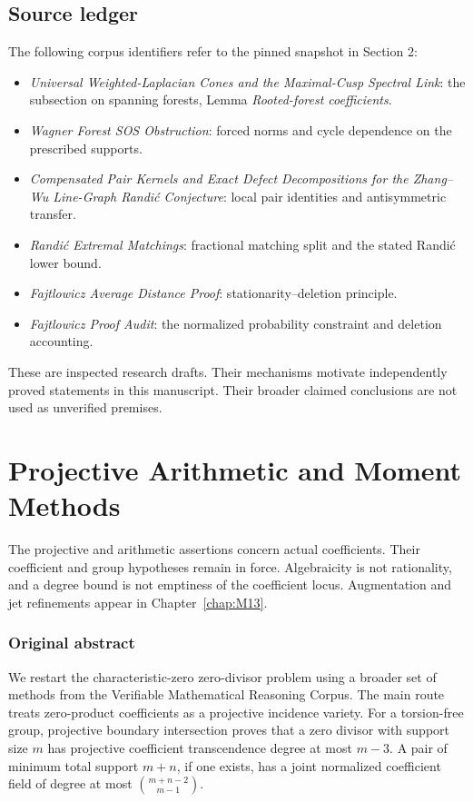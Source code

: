\documentclass[11pt,a4paper,oneside]{report}
\theoremstyle{definition}
\theoremstyle{remark}
\newcommand{\compilationnote}[1]{\medskip\noindent{\small\color{accent}\textbf{Compilation note --- 23 November 2026.}}\par
{\small #1}\par\medskip}
\begin{document}
\section{Source ledger}
The following corpus identifiers refer to the pinned snapshot in Section 2:
\begin{itemize}
\item [016] \emph{Universal Weighted-Laplacian Cones and the Maximal-Cusp Spectral Link}: the subsection on spanning forests, Lemma \emph{Rooted-forest coefficients}.
\item [160] \emph{Wagner Forest SOS Obstruction}: forced norms and cycle dependence on the prescribed supports.
\item [194] \emph{Compensated Pair Kernels and Exact Defect Decompositions for the Zhang--Wu Line-Graph Randi\'c Conjecture}: local pair identities and antisymmetric transfer.
\item [212] \emph{Randi\'c Extremal Matchings}: fractional matching split and the stated Randi\'c lower bound.
\item [226] \emph{Fajtlowicz Average Distance Proof}: stationarity--deletion principle.
\item [227] \emph{Fajtlowicz Proof Audit}: the normalized probability constraint and deletion accounting.
\end{itemize}
These are inspected research drafts. Their mechanisms motivate independently proved statements in this manuscript. Their broader claimed conclusions are not used as unverified premises.



\chapter{Projective Arithmetic and Moment Methods}\label{chap:M03}
\par
\compilationnote{The projective and arithmetic assertions concern actual coefficients.
Their coefficient and group hypotheses remain in force. Algebraicity is
not rationality, and a degree bound is not emptiness of the coefficient
locus. Augmentation and jet refinements appear in Chapter~\ref{chap:M13}.}
\subsection*{Original abstract}
We restart the characteristic-zero zero-divisor problem using a broader set of methods from the Verifiable Mathematical Reasoning Corpus. The main route treats zero-product coefficients as a projective incidence variety. For a torsion-free group, projective boundary intersection proves that a zero divisor with support size \(m\) has projective coefficient transcendence degree at most \(m-3\). A pair of minimum total support \(m+n\), if one exists, has a joint normalized coefficient field of degree at most \(\binom{m+n-2}{m-1}\).
\end{document}
